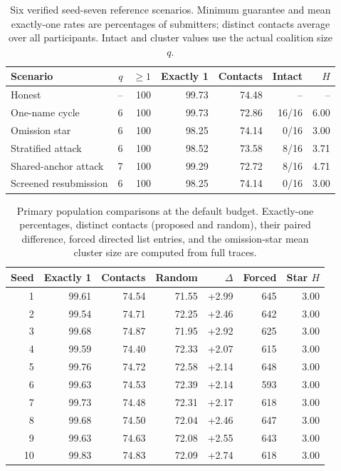 \begin{table}[tb]\centering\small
\caption{Six verified seed-seven reference scenarios. Minimum guarantee and mean exactly-one rates are percentages of submitters; distinct contacts average over all participants. Intact and cluster values use the actual coalition size $q$.}\label{tab:summary}
\begin{tabular}{@{}lrrrrrr@{}}\toprule
Scenario & $q$ & $\ge1$ & Exactly 1 & Contacts & Intact & $H$ \\ \midrule
Honest & -- & 100 & 99.73 & 74.48 & -- & -- \\
One-name cycle & 6 & 100 & 99.73 & 72.86 & 16/16 & 6.00 \\
Omission star & 6 & 100 & 98.25 & 74.14 & 0/16 & 3.00 \\
Stratified attack & 6 & 100 & 98.52 & 73.58 & 8/16 & 3.71 \\
Shared-anchor attack & 7 & 100 & 99.29 & 72.72 & 8/16 & 4.71 \\
Screened resubmission & 6 & 100 & 98.25 & 74.14 & 0/16 & 3.00 \\
\bottomrule\end{tabular}\end{table}

\begin{table}[tb]\centering\small
\caption{Primary population comparisons at the default budget. Exactly-one percentages, distinct contacts (proposed and random), their paired difference, forced directed list entries, and the omission-star mean cluster size are computed from full traces.}\label{tab:seeds}
\begin{tabular}{@{}rrrrrrr@{}}\toprule
Seed & Exactly 1 & Contacts & Random & $\Delta$ & Forced & Star $H$ \\ \midrule
1 & 99.61 & 74.54 & 71.55 & +2.99 & 645 & 3.00 \\
2 & 99.54 & 74.71 & 72.25 & +2.46 & 642 & 3.00 \\
3 & 99.68 & 74.87 & 71.95 & +2.92 & 625 & 3.00 \\
4 & 99.59 & 74.40 & 72.33 & +2.07 & 615 & 3.00 \\
5 & 99.76 & 74.72 & 72.58 & +2.14 & 648 & 3.00 \\
6 & 99.63 & 74.53 & 72.39 & +2.14 & 593 & 3.00 \\
7 & 99.73 & 74.48 & 72.31 & +2.17 & 618 & 3.00 \\
8 & 99.68 & 74.50 & 72.04 & +2.46 & 647 & 3.00 \\
9 & 99.63 & 74.63 & 72.08 & +2.55 & 643 & 3.00 \\
10 & 99.83 & 74.83 & 72.09 & +2.74 & 618 & 3.00 \\
\bottomrule\end{tabular}\end{table}


